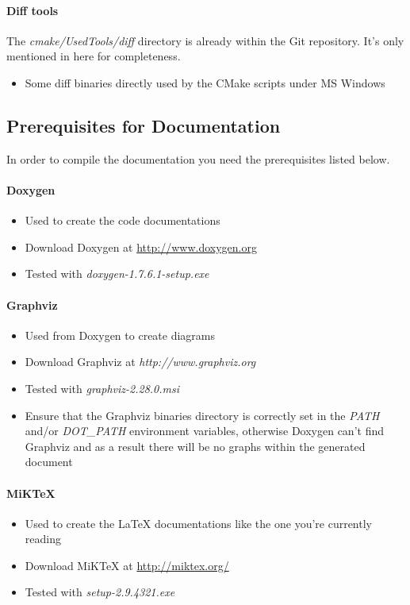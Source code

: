 \paragraph{Diff tools}
The \emph{cmake/UsedTools/diff} directory is already within the Git repository. It's only mentioned in here for completeness.
\begin{itemize}
\item{Some diff binaries directly used by the CMake scripts under \ac{MS} Windows}
\end{itemize}



\subsection{Prerequisites for Documentation}
In order to compile the documentation you need the prerequisites listed below.

\paragraph{Doxygen}
\begin{itemize}
\item{Used to create the code documentations}
\item{Download Doxygen at \url{http://www.doxygen.org}}
\item{Tested with \emph{doxygen-1.7.6.1-setup.exe}}
\end{itemize}


\paragraph{Graphviz}
\begin{itemize}
\item{Used from Doxygen to create diagrams}
\item{Download Graphviz at \emph{http://www.graphviz.org}}
\item{Tested with \emph{graphviz-2.28.0.msi}}
\item{Ensure that the Graphviz binaries directory is correctly set in the \emph{PATH} and/or \emph{DOT\_PATH} environment variables, otherwise Doxygen can't find Graphviz and as a result there will be no graphs within the generated document}
\end{itemize}


\paragraph{MiKTeX}
\begin{itemize}
\item{Used to create the \LaTeX{} documentations like the one you're currently reading}
\item{Download MiKTeX at \url{http://miktex.org/}}
\item{Tested with \emph{setup-2.9.4321.exe}}
\end{itemize}


